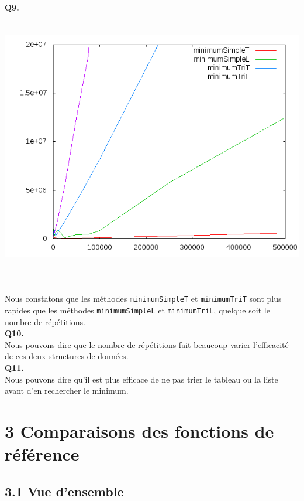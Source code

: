 \textbf{Q9.}
~\\
\includegraphics[height=12cm, width=\textwidth]{../lin_minimumTL.png}
~\\
Nous constatons que les méthodes \verb+minimumSimpleT+ et \verb+minimumTriT+ sont plus rapides que les méthodes \verb+minimumSimpleL+ et \verb+minimumTriL+, quelque soit le nombre de répétitions.
~\\

\textbf{Q10.}
~\\
Nous pouvons dire que le nombre de répétitions fait beaucoup varier l'efficacité de ces deux structures de données.
~\\

\textbf{Q11.}
~\\
Nous pouvons dire qu'il est plus efficace de ne pas trier le tableau ou la liste avant d'en rechercher le minimum.
~\\

\section*{3 Comparaisons des fonctions de référence}

\subsection*{3.1 Vue d'ensemble}
~\\

